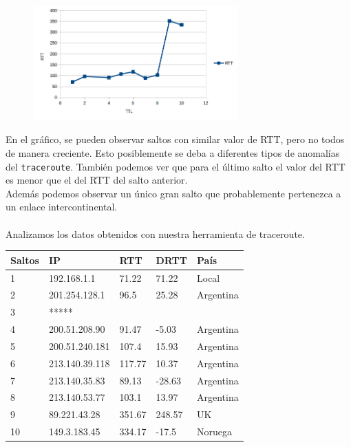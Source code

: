 \FloatBarrier

\begin{figure}[ht!]
  \centering
   \includegraphics[width=0.7\textwidth]{imagenes/NOR.png}
\end{figure}

\FloatBarrier

En el gráfico, se pueden observar saltos con similar valor de RTT, pero no todos de manera creciente. Esto posiblemente se deba a diferentes tipos de anomalías del \texttt{traceroute}.
También podemos ver que para el último salto el valor del RTT es menor que el del RTT del salto anterior.
\\
Además podemos observar un único gran salto que probablemente pertenezca a un enlace intercontinental.
\\\\
Analizamos los datos obtenidos con nuestra herramienta de traceroute.

\begin{center}
    \begin{tabular}{| l | l | l | l | l | }
    \hline
    Saltos & IP                       & RTT     & DRTT   & País          \\ \hline
    1   	   & 192.168.1.1      & 71.22   & 71.22    & Local         \\ \hline
    2   	   & 201.254.128.1    & 96.5     & 25.28    & Argentina  \\ \hline
    3   	   & *****                    &             &              &                  \\ \hline
    4   	   & 200.51.208.90    & 91.47   & -5.03     & Argentina  \\ \hline
    5   	   & 200.51.240.181  & 107.4   & 15.93    & Argentina \\ \hline
    6   	   & 213.140.39.118  & 117.77 & 10.37    & Argentina \\ \hline
    7   	   & 213.140.35.83    & 89.13   & -28.63   & Argentina \\ \hline
    8   	   & 213.140.53.77    & 103.1   & 13.97    & Argentina \\ \hline
    9   	   & 89.221.43.28      & 351.67 & 248.57  & UK  \\ \hline
    10   	   & 149.3.183.45      & 334.17 & -17.5     & Noruega \\ \hline

 \end{tabular}
\end{center} 

